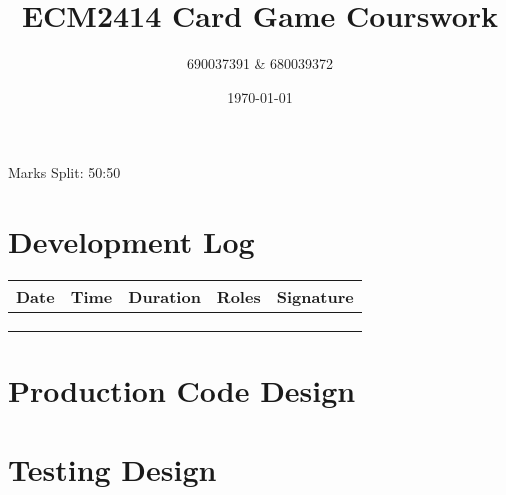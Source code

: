 \documentclass[a4paper, 11pt] {article}
\begin{document}
\title{ECM2414 Card Game Courswork}
\author{690037391 \& 680039372}
\date{\today}
\maketitle
	\begin{center}
		Marks Split: 50:50
	\end{center}
\pagebreak
\section*{Development Log}
\FloatBarrier
\begin{table}[]
\begin{tabular}{|l|l|l|l|l|}
\hline
Date & Time & Duration & Roles & Signature \\ \hline
     &      &          &       &           \\ \hline
     &      &          &       &           \\ \hline
     &      &          &       &           \\ \hline
\end{tabular}
\end{table}
\pagebreak
	\section*{Production Code Design}
\pagebreak
	\section*{Testing Design}
\end{document}
